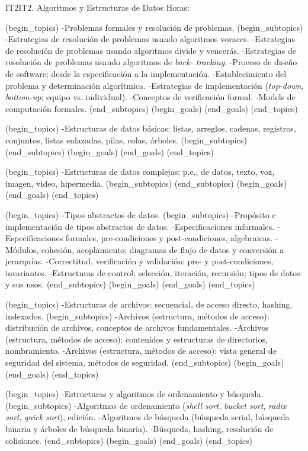 \begin{BKL2}{IT2}{IT2. Algoritmos y Estructuras de Datos}
Horas:

(begin_topics)
-Problemas formales y resolución de problemas.
(begin_subtopics)
-Estrategias de resolución de problemas usando algoritmos voraces.
-Estrategias de resolución de problemas usando algoritmos divide y vencerás.
-Estrategias de resolución de problemas usando algoritmos de {\it back- tracking}.
-Proceso de diseño de software; desde la especificación a la implementación.
-Establecimiento del problema y determinación algorítmica.
-Estrategias de implementación ({\it top-down}, {\it bottom-up}; equipo vs. individual).
-Conceptos de verificación formal.
-Models de computación formales.
(end_subtopics)
(begin_goals)
(end_goals)
(end_topics)

(begin_topics)
-Estructuras de datos básicas: listas, arreglos, cadenas, registros, conjuntos, listas enlazadas, pilas, colas, árboles.
(begin_subtopics)
(end_subtopics)
(begin_goals)
(end_goals)
(end_topics)

(begin_topics)
-Estructuras de datos complejas: p.e., de datos, texto, voz, imagen, video, hipermedia.
(begin_subtopics)
(end_subtopics)
(begin_goals)
(end_goals)
(end_topics)

(begin_topics)
-Tipos abstractos de datos.
(begin_subtopics)
-Propósito e implementación de tipos abstractos de datos.
-Especificaciones informales.
-Especificaciones formales, pre-condiciones y post-condiciones, algebraicas.
-Módulos, cohesión, acoplamiento; diagramas de flujo de datos y conversión a jerarquías.
-Correctitud, verificación y validación: pre- y post-condiciones, invariantes.
-Estructuras de control; selección, iteración, recursión; tipos de datos y sus usos.
(end_subtopics)
(begin_goals)
(end_goals)
(end_topics)

(begin_topics)
-Estructuras de archivos: secuencial, de acceso directo, hashing, indexados.
(begin_subtopics)
-Archivos (estructura, métodos de acceso): distribución de archivos, conceptos de archivos fundamentales.
-Archivos (estructura, métodos de acceso): contenidos y estructuras de directorios, nombramiento.
-Archivos (estructura, métodos de acceso): vista general de seguridad del sistema, métodos de seguridad.
(end_subtopics)
(begin_goals)
(end_goals)
(end_topics)

(begin_topics)
-Estructuras y algoritmos de ordenamiento y búsqueda.
(begin_subtopics)
-Algoritmos de ordenamiento ({\it shell sort}, {\it bucket sort}, {\it radix sort}, {\it quick sort}), edición.
-Algoritmos de búsqueda (búsqueda serial, búsqueda binaria y árboles de búsqueda binaria).
-Búsqueda, hashing, resolución de colisiones.
(end_subtopics)
(begin_goals)
(end_goals)
(end_topics)


\end{BKL2}
